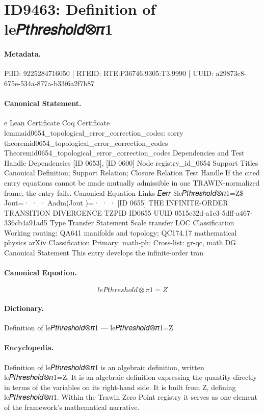 \section*{ID9463: Definition of le𝑃𝑡ℎ𝑟𝑒𝑠ℎ𝑜𝑙𝑑⊗𝜋1}
\paragraph{Metadata.}
PiID: 9225284716050 | RTEID: RTE:P36746.9305:T3.9990 | UUID: a29873c8-675e-534a-877a-b33f6a2f7b87

\paragraph{Canonical Statement.}
e Lean Certificate Coq Certificate lemmaid0654\_topological\_error\_correction\_codes: sorry theoremid0654\_topological\_error\_correction\_codes Theoremid0654\_topological\_error\_correction\_codes Dependencies and Test Handle Dependencies [ID 0653], [ID 0600] Node registry\_id\_0654 Support Titles Canonical Definition; Support Relation; Closure Relation Test Handle If the cited entry equations cannot be made mutually admissible in one TRAWIN-normalized frame, the entry fails. Canonical Equation Links 𝐸𝑒𝑟𝑟 \$le𝑃𝑡ℎ𝑟𝑒𝑠ℎ𝑜𝑙𝑑⊗𝜋1=Z\$ Jout=· · · Aadm(Jout )=· · · [ID 0655] THE INFINITE-ORDER TRANSITION DIVERGENCE TZPID ID0655 UUID 0515e32d-a1e3-5dff-a467-336cb4a91ad5 Type Transfer Statement Scale transfer LOC Classification Working routing: QA641 manifolds and topology; QC174.17 mathematical physics arXiv Classification Primary: math-ph; Cross-list: gr-qc, math.DG Canonical Statement This entry develops the infinite-order tran

\paragraph{Canonical Equation.}
\[
le𝑃𝑡ℎ𝑟𝑒𝑠ℎ𝑜𝑙𝑑⊗𝜋1=Z
\]

\paragraph{Dictionary.}
Definition of le𝑃𝑡ℎ𝑟𝑒𝑠ℎ𝑜𝑙𝑑⊗𝜋1 — le𝑃𝑡ℎ𝑟𝑒𝑠ℎ𝑜𝑙𝑑⊗𝜋1=Z

\paragraph{Encyclopedia.}
Definition of le𝑃𝑡ℎ𝑟𝑒𝑠ℎ𝑜𝑙𝑑⊗𝜋1 is an algebraic definition, written le𝑃𝑡ℎ𝑟𝑒𝑠ℎ𝑜𝑙𝑑⊗𝜋1=Z. It is an algebraic definition expressing the quantity directly in terms of the variables on its right-hand side. It is built from Z, defining le𝑃𝑡ℎ𝑟𝑒𝑠ℎ𝑜𝑙𝑑⊗𝜋1. Within the Trawin Zero Point registry it serves as one element of the framework's mathematical narrative.
